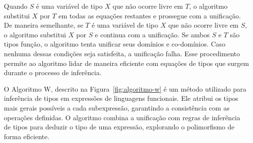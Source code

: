 Quando $S$ é uma variável de tipo $X$ que não ocorre livre em $T$, o algoritmo substitui $X$ por $T$ em todas as equações restantes e prossegue com a unificação.
De maneira semelhante, se $T$ é uma variável de tipo $X$ que não ocorre livre em $S$, o algoritmo substitui $X$ por $S$ e continua com a unificação.
Se ambos $S$ e $T$ são tipos função, o algoritmo tenta unificar seus domínios e co-domínios.
Caso nenhuma dessas condições seja satisfeita, a unificação falha.
Esse procedimento permite ao algoritmo lidar de maneira eficiente com equações de tipos que surgem durante o processo de inferência.

O Algoritmo W, descrito na Figura~\ref{fig:algoritmo-w} é um método utilizado para inferência de tipos em expressões de linguagens funcionais.
Ele atribui os tipos mais gerais possíveis a cada subexpressão, garantindo a consistência com as operações definidas.
O algoritmo combina a unificação com regras de inferência de tipos para deduzir o tipo de uma expressão, explorando o polimorfismo de forma eficiente.

